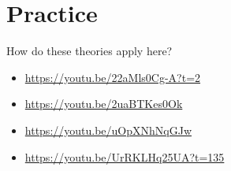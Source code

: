 \documentclass{beamer}
\begin{document}
    \section{Practice}
        \begin{frame}{How do these theories apply here?}
            \begin{itemize}
                \item \url{https://youtu.be/22aMls0Cg-A?t=2}
                \item \url{https://youtu.be/2uaBTKes0Ok}
                \item \url{https://youtu.be/uOpXNhNqGJw}
                \item \url{https://youtu.be/UrRKLHq25UA?t=135}
            \end{itemize}
        \end{frame}
\end{document}
